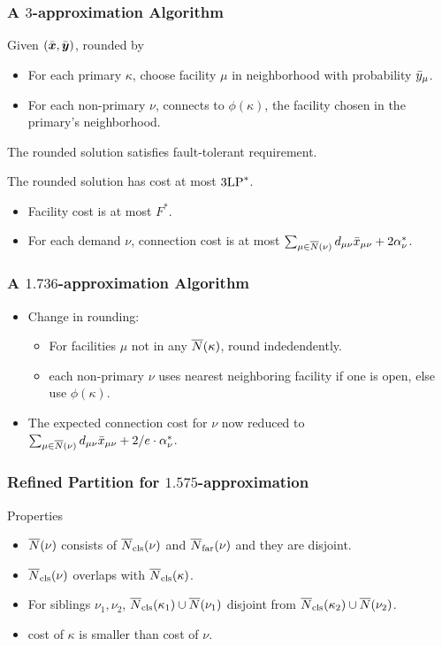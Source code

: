 \documentclass[handout, hyperref, xcolor=dvipsnames]{beamer}
\begin{document}
\begin{frame}
  \frametitle{A $3$-approximation Algorithm}
  Given $(\bar{\boldsymbol{x}},\bar{\boldsymbol{y}})$, rounded by
  \begin{itemize}
  \item For each primary $\kappa$, choose facility $\mu$ in
    neighborhood with probability ${\bar y}_{\mu}$.
  \item For each non-primary $\nu$, connects to $\phi(\kappa)$, the
    facility chosen in the primary's neighborhood.
  \end{itemize}

  The rounded solution satisfies fault-tolerant requirement.

  The rounded solution has cost at most $3\mbox{\rm LP}^\ast$.
  \begin{itemize}
  \item Facility cost is at most $F^\ast$.
  \item For each demand $\nu$, connection cost is at most $\sum_{\mu
      \in {\overline{N}}(\nu)} d_{\mu\nu} {\bar x}_{\mu\nu} + 2\alpha_{\nu}^\ast$.
  \end{itemize}
\end{frame}

\begin{frame}
  \frametitle{A $1.736$-approximation Algorithm} 

  \begin{itemize}
  \item Change in rounding: 
    \begin{itemize}
    \item For facilities $\mu$ not in any ${\overline{N}}(\kappa)$, round
      indedendently.
    \item each non-primary $\nu$ uses nearest neighboring facility if
      one is open, else use $\phi(\kappa)$.
    \end{itemize}
  \item
  The expected connection cost for $\nu$ now reduced to $\sum_{\mu
      \in {\overline{N}}(\nu)} d_{\mu\nu} {\bar x}_{\mu\nu} + 2/e\cdot
    \alpha_{\nu}^\ast$.
  \end{itemize}
\end{frame}

\begin{frame}
  \frametitle{Refined Partition for $1.575$-approximation}
  Properties
  \begin{itemize}
  \item ${\overline{N}}(\nu)$ consists of ${\overline{N}}_{{\mbox{\scriptsize\rm cls}}}(\nu)$ and
    ${\overline{N}}_{{\mbox{\scriptsize\rm far}}}(\nu)$ and they are disjoint.
  \item ${\overline{N}}_{{\mbox{\scriptsize\rm cls}}}(\nu)$ overlaps with ${\overline{N}}_{{\mbox{\scriptsize\rm cls}}}(\kappa)$.
  \item For siblings $\nu_1, \nu_2$, ${\overline{N}}_{{\mbox{\scriptsize\rm cls}}}(\kappa_1) \cup
    {\overline{N}}(\nu_1)$ disjoint from ${\overline{N}}_{{\mbox{\scriptsize\rm cls}}}(\kappa_2) \cup
    {\overline{N}}(\nu_2)$.
  \item cost of $\kappa$ is smaller than cost of $\nu$.
  \end{itemize}
\end{frame}
\end{document}
